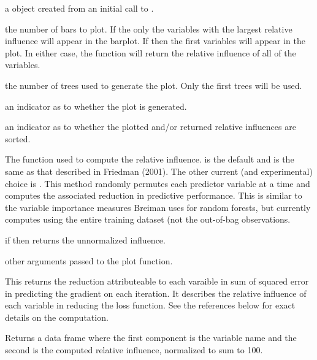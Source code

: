 \documentclass[a4paper]{book}
\begin{document}
\begin{Arguments}
\begin{ldescription}
\item[\code{object}] a  object created from an initial call to
.
\item[\code{cBars}]  the number of bars to plot. If  the only the
variables with the  largest relative influence will appear in the
barplot. If  then the first  variables will
appear in the plot. In either case, the function will return the relative
influence of all of the variables.
\item[\code{n.trees}]  the number of trees used to generate the plot. Only the first
 trees will be used.
\item[\code{plotit}]  an indicator as to whether the plot is generated. 
\item[\code{order}]  an indicator as to whether the plotted and/or returned relative
influences are sorted. 
\item[\code{method}]  The function used to compute the relative influence.
 is the default and is the same as that
described in Friedman (2001). The other current (and experimental) choice is
. This method randomly permutes each predictor
variable at a time and computes the associated reduction in predictive
performance. This is similar to the variable importance measures Breiman uses
for random forests, but  currently computes using the entire training
dataset (not the out-of-bag observations.
\item[\code{normalize}]  if  then  returns the 
unnormalized influence. 
\item[\code{...}]  other arguments passed to the plot function. 
\end{ldescription}
\end{Arguments}
%
\begin{Details}\relax
This returns the reduction attributeable to each varaible in sum of squared error in 
predicting the gradient on each iteration. It describes the relative influence 
of each variable in reducing the loss function. See the references below for 
exact details on the computation.
\end{Details}
%
\begin{Value}
Returns a data frame where the first component is the variable name and the
second is the computed relative influence, normalized to sum to 100.
\end{Value}
\end{document}
